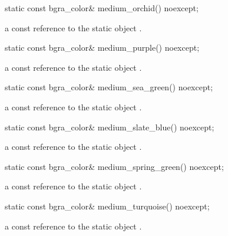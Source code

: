 \begin{itemdecl}
static const bgra_color& medium_orchid() noexcept;
\end{itemdecl}
\begin{itemdescr}
\pnum
\returns
a const reference to the static  object .
\end{itemdescr}

\begin{itemdecl}
static const bgra_color& medium_purple() noexcept;
\end{itemdecl}
\begin{itemdescr}
\pnum
\returns
a const reference to the static  object .
\end{itemdescr}

\begin{itemdecl}
static const bgra_color& medium_sea_green() noexcept;
\end{itemdecl}
\begin{itemdescr}
\pnum
\returns
a const reference to the static  object .
\end{itemdescr}

\begin{itemdecl}
static const bgra_color& medium_slate_blue() noexcept;
\end{itemdecl}
\begin{itemdescr}
\pnum
\returns
a const reference to the static  object .
\end{itemdescr}

\begin{itemdecl}
static const bgra_color& medium_spring_green() noexcept;
\end{itemdecl}
\begin{itemdescr}
\pnum
\returns
a const reference to the static  object .
\end{itemdescr}

\begin{itemdecl}
static const bgra_color& medium_turquoise() noexcept;
\end{itemdecl}
\begin{itemdescr}
\pnum
\returns
a const reference to the static  object .
\end{itemdescr}


